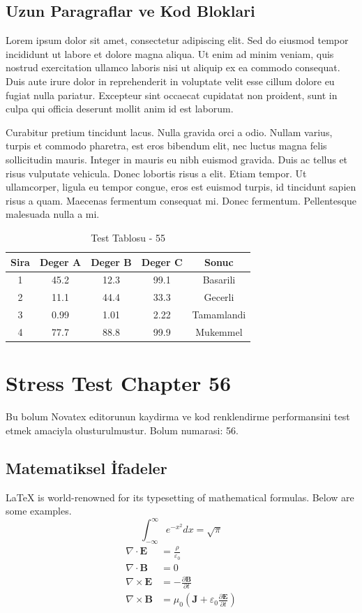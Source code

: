\documentclass[12pt,a4paper]{article}
\begin{document}
\subsection{Uzun Paragraflar ve Kod Bloklari}
Lorem ipsum dolor sit amet, consectetur adipiscing elit. Sed do eiusmod tempor incididunt ut labore et dolore magna aliqua. Ut enim ad minim veniam, quis nostrud exercitation ullamco laboris nisi ut aliquip ex ea commodo consequat. Duis aute irure dolor in reprehenderit in voluptate velit esse cillum dolore eu fugiat nulla pariatur. Excepteur sint occaecat cupidatat non proident, sunt in culpa qui officia deserunt mollit anim id est laborum.

Curabitur pretium tincidunt lacus. Nulla gravida orci a odio. Nullam varius, turpis et commodo pharetra, est eros bibendum elit, nec luctus magna felis sollicitudin mauris. Integer in mauris eu nibh euismod gravida. Duis ac tellus et risus vulputate vehicula. Donec lobortis risus a elit. Etiam tempor. Ut ullamcorper, ligula eu tempor congue, eros est euismod turpis, id tincidunt sapien risus a quam. Maecenas fermentum consequat mi. Donec fermentum. Pellentesque malesuada nulla a mi.

\begin{table}[h!]
\centering
\begin{tabular}{|c|c|c|c|c|}
\hline
\textbf{Sira} & \textbf{Deger A} & \textbf{Deger B} & \textbf{Deger C} & \textbf{Sonuc} \\
\hline
1 & 45.2 & 12.3 & 99.1 & Basarili \\
2 & 11.1 & 44.4 & 33.3 & Gecerli \\
3 & 0.99 & 1.01 & 2.22 & Tamamlandi \\
4 & 77.7 & 88.8 & 99.9 & Mukemmel \\
\hline
\end{tabular}
\caption{Test Tablosu - 55}
\end{table}

\newpage
\section{Stress Test Chapter 56}
Bu bolum Novatex editorunun kaydirma ve kod renklendirme performansini test etmek amaciyla olusturulmustur. Bolum numarasi: 56.

\subsection{Matematiksel İfadeler}
\LaTeX{} is world-renowned for its typesetting of mathematical formulas. Below are some examples.
\begin{equation}
\int_{-\infty}^{\infty} e^{-x^2} dx = \sqrt{\pi}
\end{equation}
\begin{align}
\nabla \cdot \mathbf{E} &= \frac{\rho}{\varepsilon_0} \\
\nabla \cdot \mathbf{B} &= 0 \\
\nabla \times \mathbf{E} &= -\frac{\partial \mathbf{B}}{\partial t} \\
\nabla \times \mathbf{B} &= \mu_0\left(\mathbf{J} + \varepsilon_0 \frac{\partial \mathbf{E}}{\partial t}\right)
\end{align}
\end{document}
